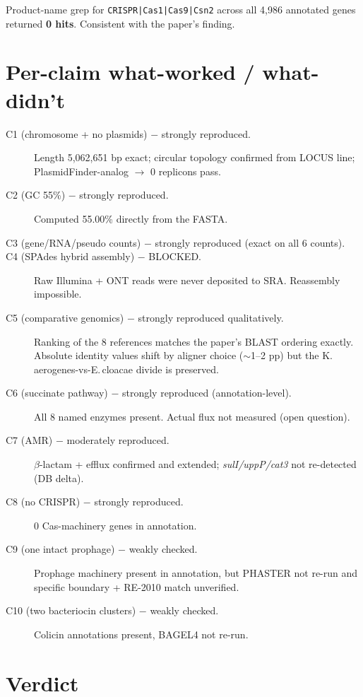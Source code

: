 \documentclass[11pt,letterpaper]{article}
\begin{document}
Product-name grep for \texttt{CRISPR|Cas1|Cas9|Csn2} across all 4{,}986 annotated genes returned \textbf{0 hits}. Consistent with the paper's finding.

\section{Per-claim what-worked / what-didn't}

\begin{description}
  \item[C1 (chromosome + no plasmids) $-$ strongly reproduced.] Length 5{,}062{,}651 bp exact; circular topology confirmed from LOCUS line; PlasmidFinder-analog $\rightarrow$ 0 replicons pass.
  \item[C2 (GC 55\%) $-$ strongly reproduced.] Computed 55.00\% directly from the FASTA.
  \item[C3 (gene/RNA/pseudo counts) $-$ strongly reproduced (exact on all 6 counts).]
  \item[C4 (SPAdes hybrid assembly) $-$ BLOCKED.] Raw Illumina + ONT reads were never deposited to SRA. Reassembly impossible.
  \item[C5 (comparative genomics) $-$ strongly reproduced qualitatively.] Ranking of the 8 references matches the paper's BLAST ordering exactly. Absolute identity values shift by aligner choice ($\sim$1--2 pp) but the K.\,aerogenes-vs-E.\,cloacae divide is preserved.
  \item[C6 (succinate pathway) $-$ strongly reproduced (annotation-level).] All 8 named enzymes present. Actual flux not measured (open question).
  \item[C7 (AMR) $-$ moderately reproduced.] $\beta$-lactam + efflux confirmed and extended; \emph{sulI/uppP/cat3} not re-detected (DB delta).
  \item[C8 (no CRISPR) $-$ strongly reproduced.] 0 Cas-machinery genes in annotation.
  \item[C9 (one intact prophage) $-$ weakly checked.] Prophage machinery present in annotation, but PHASTER not re-run and specific boundary + RE-2010 match unverified.
  \item[C10 (two bacteriocin clusters) $-$ weakly checked.] Colicin annotations present, BAGEL4 not re-run.
\end{description}

\section{Verdict}
\end{document}
